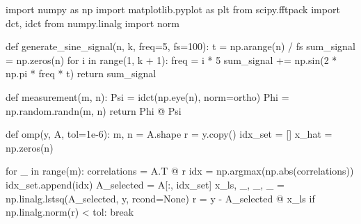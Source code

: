 \documentclass[
  letterpaper,
  DIV=11,
  numbers=noendperiod]{scrartcl}
\newenvironment{Shaded}{\begin{snugshade}}{\end{snugshade}}
\newcommand{\BuiltInTok}[1]{\textcolor[rgb]{0.40,0.85,0.94}{#1}}
\newcommand{\ControlFlowTok}[1]{\textcolor[rgb]{0.98,0.15,0.45}{#1}}
\newcommand{\DecValTok}[1]{\textcolor[rgb]{0.68,0.51,1.00}{#1}}
\newcommand{\FloatTok}[1]{\textcolor[rgb]{0.68,0.51,1.00}{#1}}
\newcommand{\ImportTok}[1]{\textcolor[rgb]{0.98,0.15,0.45}{#1}}
\newcommand{\KeywordTok}[1]{\textcolor[rgb]{0.98,0.15,0.45}{#1}}
\newcommand{\NormalTok}[1]{\textcolor[rgb]{0.97,0.97,0.95}{#1}}
\newcommand{\OperatorTok}[1]{\textcolor[rgb]{0.97,0.97,0.95}{#1}}
\newcommand{\StringTok}[1]{\textcolor[rgb]{0.90,0.86,0.45}{#1}}
\newcommand{\VariableTok}[1]{\textcolor[rgb]{0.97,0.97,0.95}{#1}}
\begin{document}
\begin{Shaded}
\begin{Highlighting}[]
\ImportTok{import}\NormalTok{ numpy }\ImportTok{as}\NormalTok{ np}
\ImportTok{import}\NormalTok{ matplotlib.pyplot }\ImportTok{as}\NormalTok{ plt}
\ImportTok{from}\NormalTok{ scipy.fftpack }\ImportTok{import}\NormalTok{ dct, idct}
\ImportTok{from}\NormalTok{ numpy.linalg }\ImportTok{import}\NormalTok{ norm}

\KeywordTok{def}\NormalTok{ generate\_sine\_signal(n, k, freq}\OperatorTok{=}\DecValTok{5}\NormalTok{, fs}\OperatorTok{=}\DecValTok{100}\NormalTok{):}
\NormalTok{    t }\OperatorTok{=}\NormalTok{ np.arange(n) }\OperatorTok{/}\NormalTok{ fs}
\NormalTok{    sum\_signal }\OperatorTok{=}\NormalTok{ np.zeros(n)}
    \ControlFlowTok{for}\NormalTok{ i }\KeywordTok{in} \BuiltInTok{range}\NormalTok{(}\DecValTok{1}\NormalTok{, k }\OperatorTok{+} \DecValTok{1}\NormalTok{):}
\NormalTok{        freq }\OperatorTok{=}\NormalTok{ i }\OperatorTok{*} \DecValTok{5}
\NormalTok{        sum\_signal }\OperatorTok{+=}\NormalTok{ np.sin(}\DecValTok{2} \OperatorTok{*}\NormalTok{ np.pi }\OperatorTok{*}\NormalTok{ freq }\OperatorTok{*}\NormalTok{ t)}
    \ControlFlowTok{return}\NormalTok{ sum\_signal}

\KeywordTok{def}\NormalTok{ measurement(m, n):}
\NormalTok{    Psi }\OperatorTok{=}\NormalTok{ idct(np.eye(n), norm}\OperatorTok{=}\StringTok{\textquotesingle{}ortho\textquotesingle{}}\NormalTok{)}
\NormalTok{    Phi }\OperatorTok{=}\NormalTok{ np.random.randn(m, n)}
    \ControlFlowTok{return}\NormalTok{ Phi }\OperatorTok{@}\NormalTok{ Psi}

\KeywordTok{def}\NormalTok{ omp(y, A, tol}\OperatorTok{=}\FloatTok{1e{-}6}\NormalTok{):}
\NormalTok{    m, n }\OperatorTok{=}\NormalTok{ A.shape}
\NormalTok{    r }\OperatorTok{=}\NormalTok{ y.copy()}
\NormalTok{    idx\_set }\OperatorTok{=}\NormalTok{ []}
\NormalTok{    x\_hat }\OperatorTok{=}\NormalTok{ np.zeros(n)}

    \ControlFlowTok{for}\NormalTok{ \_ }\KeywordTok{in} \BuiltInTok{range}\NormalTok{(m):}
\NormalTok{        correlations }\OperatorTok{=}\NormalTok{ A.T }\OperatorTok{@}\NormalTok{ r}
\NormalTok{        idx }\OperatorTok{=}\NormalTok{ np.argmax(np.}\BuiltInTok{abs}\NormalTok{(correlations))}
\NormalTok{        idx\_set.append(idx)}
\NormalTok{        A\_selected }\OperatorTok{=}\NormalTok{ A[:, idx\_set]}
\NormalTok{        x\_ls, \_, \_, \_ }\OperatorTok{=}\NormalTok{ np.linalg.lstsq(A\_selected, y, rcond}\OperatorTok{=}\VariableTok{None}\NormalTok{)}
\NormalTok{        r }\OperatorTok{=}\NormalTok{ y }\OperatorTok{{-}}\NormalTok{ A\_selected }\OperatorTok{@}\NormalTok{ x\_ls}
        \ControlFlowTok{if}\NormalTok{ np.linalg.norm(r) }\OperatorTok{\textless{}}\NormalTok{ tol:}
            \ControlFlowTok{break}


\end{Highlighting}
\end{Shaded}
\end{document}
